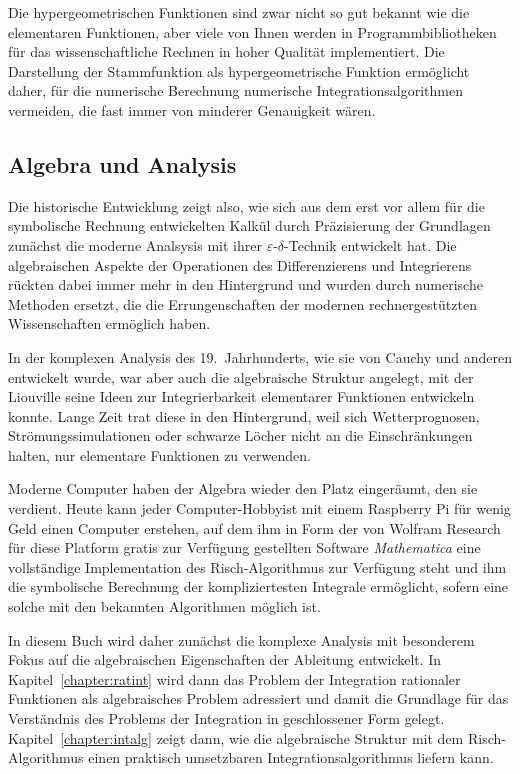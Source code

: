 Die hypergeometrischen Funktionen sind zwar nicht so gut bekannt wie
die elementaren Funktionen, aber viele von Ihnen werden in
Programmbibliotheken für das wissenschaftliche Rechnen in hoher Qualität
implementiert.
Die Darstellung der Stammfunktion als hypergeometrische Funktion
ermöglicht daher, für die numerische Berechnung numerische
Integrationsalgorithmen vermeiden, die fast immer von minderer
Genauigkeit wären.

%
%
\subsection{Algebra und Analysis}
Die historische Entwicklung zeigt also, wie sich aus dem erst vor
allem für die symbolische Rechnung entwickelten Kalkül durch
Präzisierung der Grundlagen zunächst die moderne Analsysis mit
ihrer $\varepsilon$-$\delta$-Technik entwickelt hat.
Die algebraischen Aspekte der Operationen des Differenzierens
und Integrierens rückten dabei immer mehr in den Hintergrund und
wurden durch numerische Methoden ersetzt, die die Errungenschaften
der modernen rechnergestützten Wissenschaften ermöglich haben.

In der komplexen Analysis des 19.~Jahrhunderts, wie sie von Cauchy
%
%
und anderen entwickelt wurde, war aber auch die algebraische Struktur
angelegt, mit der Liouville seine Ideen zur Integrierbarkeit
elementarer Funktionen entwickeln konnte.
Lange Zeit trat diese in den Hintergrund, weil sich 
Wetterprognosen, Strömungssimulationen oder schwarze Löcher nicht
an die Einschränkungen halten, nur elementare Funktionen zu verwenden.

Moderne Computer haben der Algebra wieder den Platz eingeräumt, den
sie verdient.
Heute kann jeder Computer-Hobbyist mit einem Raspberry Pi für wenig
%
Geld einen Computer erstehen, auf dem ihm in Form der von Wolfram
Research für diese Platform gratis zur Verfügung gestellten Software
\emph{Mathematica} eine vollständige Implementation
%
des Risch-Algorithmus zur Verfügung steht und ihm die symbolische Berechnung
der kompliziertesten Integrale ermöglicht, sofern eine solche mit den
bekannten Algorithmen möglich ist.

In diesem Buch wird daher zunächst die komplexe Analysis mit besonderem
Fokus auf die algebraischen Eigenschaften der Ableitung entwickelt.
In Kapitel~\ref{chapter:ratint} wird dann das Problem der Integration
rationaler Funktionen als algebraisches Problem adressiert und damit
die Grundlage für das Verständnis des Problems der Integration in
geschlossener Form gelegt.
Kapitel~\ref{chapter:intalg} zeigt dann, wie die algebraische
Struktur mit dem Risch-Algorithmus einen praktisch umsetzbaren
Integrationsalgorithmus liefern kann.



